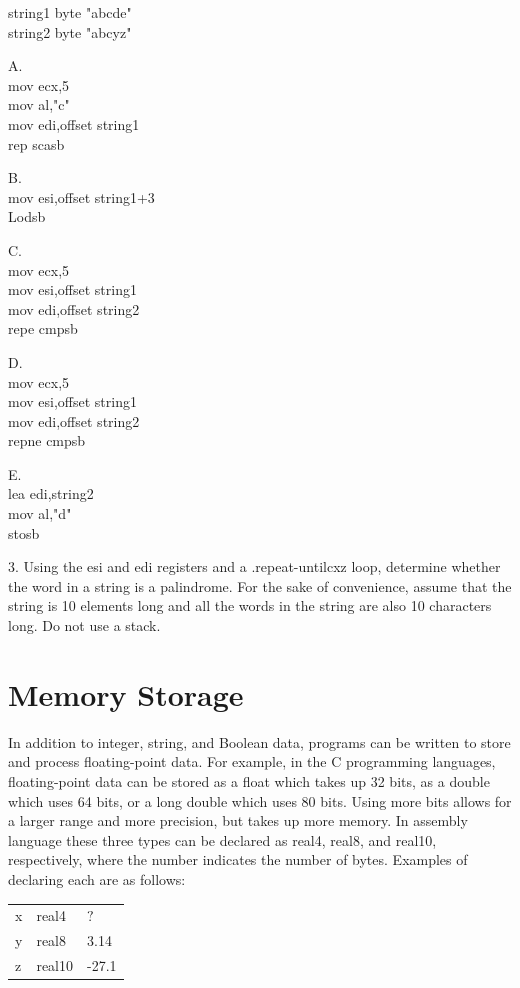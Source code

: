 \documentclass[10pt]{book}
\begin{document}
string1 byte "abcde"\\
string2 byte "abcyz"

A.\\
mov ecx,5\\
mov al,"c"\\
mov edi,offset string1\\
rep scasb

B.\\
mov esi,offset string1+3\\
Lodsb

C.\\
mov ecx,5\\
mov esi,offset string1\\
mov edi,offset string2\\
repe cmpsb

D.\\
mov ecx,5\\
mov esi,offset string1\\
mov edi,offset string2\\
repne cmpsb

E.\\
lea edi,string2\\
mov al,"d"\\
stosb

3. Using the esi and edi registers and a .repeat-untilcxz loop, determine whether the word in a string is a palindrome. For the sake of convenience, assume that the string is 10 elements long and all the words in the string are also 10 characters long. Do not use a stack.
\section{Memory Storage}
In addition to integer, string, and Boolean data, programs can be written to store and process floating-point data. For example, in the C programming languages, floating-point data can be stored as a float which takes up 32 bits, as a double which uses 64 bits, or a long double which uses 80 bits. Using more bits allows for a larger range and more precision, but takes up more memory. In assembly language these three types can be declared as real4, real8, and real10, respectively, where the number indicates the number of bytes. Examples of declaring each are as follows:

\begin{table}[h]
\centering
\begin{tabular}{lll}
x & real4 & $?$ \\
y & real8 & 3.14 \\
z & real10 & -27.1 \\
\end{tabular}
\end{table}
\end{document}
